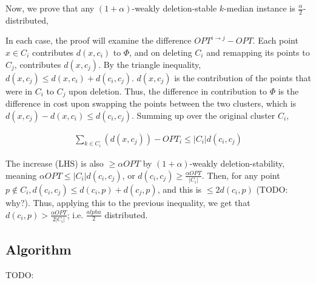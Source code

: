 \documentclass[paper=a4, fontsize=11pt]{scrartcl} %
\numberwithin{equation}{section} %
\numberwithin{figure}{section} %
\numberwithin{table}{section} %
\begin{document}
Now, we prove that any $(1+\alpha)$-weakly deletion-stable $k$-median instance is $\frac{\alpha}{2}$-distributed,


In each case, the proof will examine the difference $OPT^{i \rightarrow j} - OPT$.  Each point $x \in C_i$ contributes $d(x, c_i)$ to $\Phi$, and on deleting $C_i$ and remapping its points to $C_j$, contributes $d(x, c_j)$.  By the triangle inequality, $d(x, c_j) \leq d(x, c_i) + d(c_i, c_j)$.  $d(x, c_j)$ is the contribution of the points that were in $C_i$ to $C_j$ upon deletion.  Thus, the difference in contribution to $\Phi$ is the difference in cost upon swapping the points between the two clusters, which is $ d(x, c_j)  - d(x, c_i) \leq d(c_i, c_j)$.  Summing up over the original cluster $C_i$,

\begin{align}
\sum_{k \in C_i} (d(x, c_j) )  - OPT_i \leq |C_i| d(c_i, c_j)
\end{align}

The increase (LHS) is also $ \geq \alpha OPT$ by $(1+\alpha)$-weakly deletion-stability, meaning $\alpha OPT \leq |C_i| d(c_i, c_j)$, or $d(c_i, c_j) \geq \frac{\alpha OPT}{|C_i|}$.  Then, for any point $p \notin C_i, d(c_i, c_j) \leq d(c_i, p) + d(c_j, p)$, and this is $\leq 2d(c_i, p)$ (TODO: why?).  Thus, applying this to the previous inequality, we get that $d(c_i, p) > \frac{\alpha OPT}{2 |C_i|}$; i.e. $\frac{alpha}{2}$ distributed.

\subsection{Algorithm}
TODO:
\end{document}
